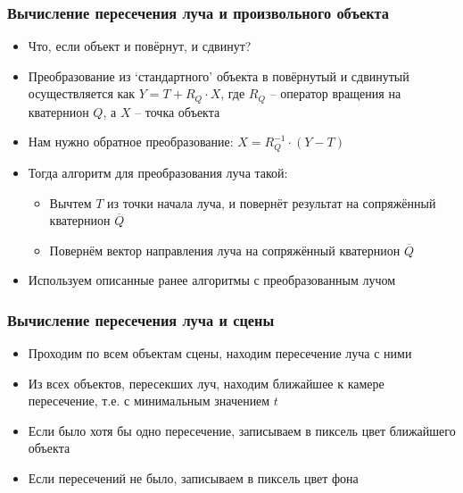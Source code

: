 \documentclass[10pt,handout]{beamer}
\begin{document}
\begin{frame}
\frametitle{Вычисление пересечения луча и произвольного объекта}
\begin{itemize}
\item Что, если объект и повёрнут, и сдвинут?
\pause
\item Преобразование из `стандартного' объекта в повёрнутый и сдвинутый осуществляется как \begin{math}Y = T + R_Q\cdot X\end{math}, где \begin{math}R_Q\end{math} -- оператор вращения на кватернион \begin{math}Q\end{math}, а \begin{math}X\end{math} -- точка объекта
\pause
\item Нам нужно обратное преобразование: \begin{math}X = R_Q^{-1} \cdot (Y - T)\end{math}
\pause
\item Тогда алгоритм для преобразования луча такой:
\pause
\begin{itemize}
\item Вычтем \begin{math}T\end{math} из точки начала луча, и повернёт результат на сопряжённый кватернион \begin{math}\overline{Q}\end{math}
\pause
\item Повернём вектор направления луча на сопряжённый кватернион \begin{math}\overline{Q}\end{math}
\end{itemize}
\pause
\item Используем описанные ранее алгоритмы с преобразованным лучом
\end{itemize}
\end{frame}

\begin{frame}
\frametitle{Вычисление пересечения луча и сцены}
\begin{itemize}
\item Проходим по всем объектам сцены, находим пересечение луча с ними
\pause
\item Из всех объектов, пересекших луч, находим ближайшее к камере пересечение, т.е. с минимальным значением \begin{math}t\end{math}
\pause
\item Если было хотя бы одно пересечение, записываем в пиксель цвет ближайшего объекта
\pause
\item Если пересечений не было, записываем в пиксель цвет фона
\end{itemize}
\end{frame}
\end{document}
